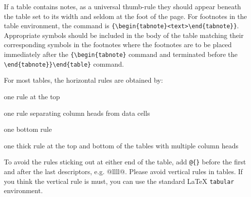 If a table contains notes, as a
universal thumb-rule they should appear beneath the table set to its
width and seldom at the foot of the page. For footnotes in the
table environment, the command is
\verb|{\begin{tabnote}<text>\end{tabnote}}|. Appropriate symbols
should be included in the body of the table matching their
corresponding symbols in the footnotes where the footnotes are to be
placed immediately after the \verb|{\begin{tabnote}| command and
terminated before the \verb|\end{tabnote}}\end{table}| command.

For most tables, the horizontal rules are obtained by:

\begin{description}
\item[toprule] one rule at the top
\item[colrule] one rule separating column heads from data cells
\item[botrule] one bottom rule
\item[Hline] one thick rule at the top and bottom of the tables with multiple column heads
\end{description}

To avoid the rules sticking out at either end of the table, add
\verb|@{}| before the first and after the last descriptors, e.g.
{@{}llll@{}}. Please avoid vertical rules in tables. If you
think the vertical rule is must, you can use the standard \LaTeX{}
\verb|tabular| environment.

